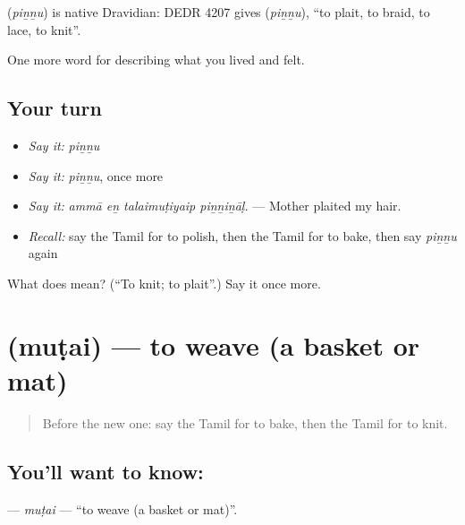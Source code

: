 \begin{cousinweb}
\textbf{} (\emph{piṉṉu}) is native Dravidian: DEDR 4207 gives  (\emph{piṉṉu}), \textquotedblleft{}to plait, to braid, to lace, to knit\textquotedblright{}.
\end{cousinweb}

\begin{grammarlens}[title={What you've built}]
One more word for describing what you lived and felt.
\end{grammarlens}

\subsection*{Your turn}
\begin{itemize}
\raggedright
  \item \emph{Say it:} \emph{piṉṉu}
  \item \emph{Say it:} \emph{piṉṉu}, once more
  \item \emph{Say it:} \emph{ammā eṉ talaimuṭiyaip piṉṉiṉāḷ.} — Mother plaited my hair.
  \item \emph{Recall:} say the Tamil for to polish, then the Tamil for to bake, then say \emph{piṉṉu} again
\end{itemize}

\begin{tcolorbox}[breakable,colback=teal!4,colframe=teal!35!black,title={Before you move on}]
What does  mean? (\textquotedblleft{}To knit; to plait\textquotedblright{}.) Say it once more.
\end{tcolorbox}
\section[\texorpdfstring{\ta{முடை} (muṭai)}{முடை (muṭai)}]{ (muṭai) — to weave (a basket or mat)}

\label{lesson:TA-C538-mutai}



\begin{quote}
Before the new one: say the Tamil for to bake, then the Tamil for to knit.
\end{quote}

\subsection*{You'll want to know: }
\textbf{} — \emph{muṭai} — \textquotedblleft{}to weave (a basket or mat)\textquotedblright{}.


